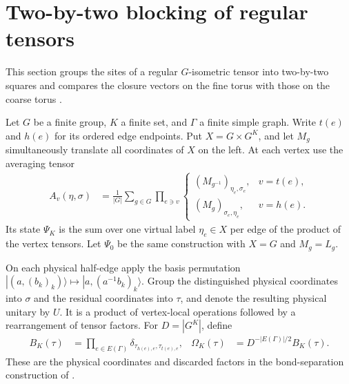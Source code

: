 \section{Two-by-two blocking of regular tensors}%
\label{sec:peps_regular_two_by_two_blocking}

This section groups the sites of a regular $G$-isometric tensor into
two-by-two squares and compares the closure vectors on the fine torus with
those on the coarse torus \cite{Schuch2010PEPS}.


\begin{definition}%
    \label{def:peps_regular_graph_bond_blocking}
    \leanok
    Let $G$ be a finite group, $K$ a finite set, and $\Gamma$ a finite simple
    graph. Write $t(e)$ and $h(e)$ for its ordered edge endpoints. Put
    $X=G\times G^K$, and let $M_g$ simultaneously translate all coordinates
    of $X$ on the left. At each vertex use the averaging tensor
    \begin{align}
        A_v(\eta,\sigma)
         & =\frac{1}{|G|}\sum_{g\in G}
        \prod_{e\ni v}
        \begin{cases}
            (M_{g^{-1}})_{\eta_e,\sigma_e}, & v=t(e), \\
            (M_g)_{\sigma_e,\eta_e},        & v=h(e).
        \end{cases}
        \label{eq:peps_bundle_average}
    \end{align}
    Its state $\Psi_K$ is the sum over one virtual label $\eta_e\in X$
    per edge of the product of the vertex tensors. Let $\Psi_0$ be the same
    construction with $X=G$ and $M_g=L_g$.

    On each physical half-edge apply the basis permutation
    $|(a,(b_k)_k)\rangle\mapsto|a,(a^{-1}b_k)_k\rangle$.
    Group the distinguished physical coordinates into $\sigma$ and the
    residual coordinates into $\tau$, and denote the resulting physical
    unitary by $U$. It is a product of vertex-local operations followed by
    a rearrangement of tensor factors. For $D=|G^K|$, define
    \begin{align}
        B_K(\tau)                             & =\prod_{e\in E(\Gamma)}
        \delta_{\tau_{h(e),e},\tau_{t(e),e}}, &
        \Omega_K(\tau)                        & =D^{-|E(\Gamma)|/2}B_K(\tau).
    \end{align}
    These are the physical coordinates and discarded factors in the
    bond-separation construction of \cite[Observations~6.5--6.6]{Schuch2010PEPS}.
\end{definition}

